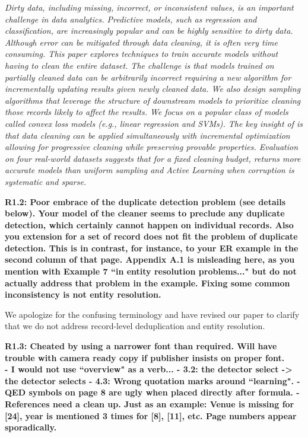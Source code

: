 \emph{Dirty data, including missing, incorrect, or inconsistent values, is an important challenge in data analytics.
Predictive models, such as regression and classification, are increasingly popular and can be highly sensitive to dirty data.
Although error can be mitigated through data cleaning, it is often very time consuming.
This paper explores techniques to train accurate models without having to clean the entire dataset.
The challenge is that models trained on partially cleaned data can be arbitrarily incorrect requiring a new algorithm for incrementally updating results given newly cleaned data.
We also design sampling algorithms that leverage the structure of downstream models to prioritize cleaning those records likely to affect the results.
We focus on a popular class of models called convex loss models (e.g., linear regression and SVMs).
The key insight of \sys is that data cleaning can be applied simultaneously with incremental optimization allowing for progressive cleaning while preserving provable properties.
Evaluation on four real-world datasets suggests that for a fixed cleaning budget, \sys returns more accurate models than uniform sampling and Active Learning when corruption is systematic and sparse.}

\vspace{0.5em}

\noindent\textbf{R1.2: Poor embrace of the duplicate detection problem (see details below). Your model of the cleaner seems to preclude any duplicate detection, which certainly cannot happen on individual records. Also you extension for a set of record does not fit the problem of duplicate detection. This is in contrast, for instance, to your ER example in the second column of that page. Appendix A.1 is misleading here, as you mention with Example 7 ``in entity resolution problems..." but do not actually address that problem in the example. Fixing some common inconsistency is not entity resolution.}

We apologize for the confusing terminology and have revised our paper to clarify that we do not address record-level deduplication and entity resolution.

\vspace{0.5em}

\noindent\textbf{R1.3: Cheated by using a narrower font than required. Will have trouble with camera ready copy if publisher insists on proper font.\\
- I would not use ``overview" as a verb...
- 3.2: the detector select -> the detector selects
- 4.3: Wrong quotation marks around ``learning".
- QED symbols on page 8 are ugly when placed directly after formula. 
- References need a clean up. Just as an example: Venue is missing for [24], year is mentioned 3 times for [8], [11], etc. Page numbers appear sporadically.}

